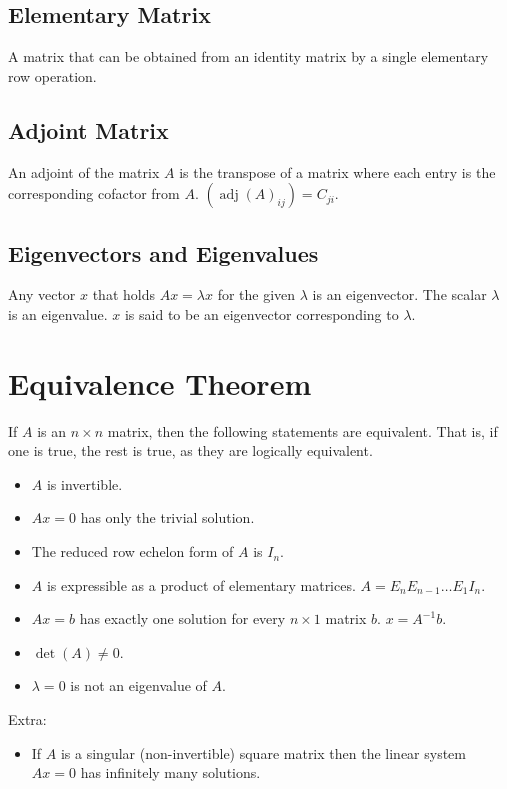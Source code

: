 \documentclass[12pt]{article}
\DeclareMathOperator{\adj}{adj}
\begin{document}
\subsection{Elementary Matrix}

A matrix that can be obtained from an identity matrix by a single elementary row operation.


\subsection{Adjoint Matrix}

An adjoint of the matrix $A$ is the transpose of a matrix where each entry is the corresponding cofactor from $A$. $(\adj(A)_{ij}) = C_{ji}$.


\subsection{Eigenvectors and Eigenvalues}

Any vector $x$ that holds $Ax = \lambda x$ for the given $\lambda$ is an eigenvector. The scalar $\lambda$ is an eigenvalue. $x$ is said to be an eigenvector corresponding to $\lambda$.


\section{Equivalence Theorem}

If $A$ is an $n \times n$ matrix, then the following statements are equivalent. That is, if one is true, the rest is true, as they are logically equivalent.
\begin{itemize}
    \item $A$ is invertible.
    \item $Ax = 0$ has only the trivial solution.
    \item The reduced row echelon form of $A$ is $I_n$.
    \item $A$ is expressible as a product of elementary matrices. $A = E_nE_{n-1}\dots E_1I_n$.
    \item $Ax = b$ has exactly one solution for every $n \times 1$ matrix $b$. $x = A^{-1}b$.
    \item $\det(A) \neq 0$.
    \item $\lambda = 0$ is not an eigenvalue of $A$.
\end{itemize}
Extra:
\begin{itemize}
    \item If $A$ is a singular (non-invertible) square matrix then the linear system $Ax = 0$ has infinitely many solutions.
\end{itemize}
\end{document}
